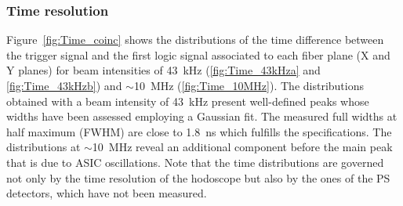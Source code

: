 \documentclass[a4paper,11pt]{article}
\begin{document}
\subsubsection{Time resolution}

Figure~\ref{fig:Time_coinc} shows the distributions of the time difference between the trigger signal and the first logic signal associated to each fiber plane (X and Y planes)  for beam intensities of 43~kHz (\ref{fig:Time_43kHza} and \ref{fig:Time_43kHzb}) and $\sim$10~MHz (\ref{fig:Time_10MHz}). The distributions obtained with a beam intensity of 43~kHz present well-defined peaks whose widths have been assessed employing a Gaussian fit. The measured full widths at half maximum (FWHM) are close to 1.8~ns which fulfills the specifications. The distributions at $\sim$10~MHz reveal an additional component before the main peak that is due to ASIC oscillations. Note that the time distributions are governed not only by the time resolution of the hodoscope but also by the ones of the PS detectors, which have not been measured.
\label{Time_resolution}
\end{document}

